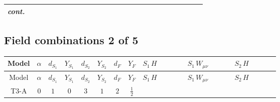\documentclass[8pt]{article}
\begin{document}
\begin{landscape}
\begin{longtable}{@{}cccccccc >{\raggedright\arraybackslash}p{0.21\linewidth} >{\raggedright\arraybackslash}p{0.21\linewidth} >{\raggedright\arraybackslash}p{0.21\linewidth}@{}}
\textit{cont.} &  &  &  &  &  &  &  & \scriptsize\adjustbox{max width=\linewidth}{$\begin{gathered} -H_{a_1} \mu ^2 H_{a_1}{}^{\dagger } \\ +\frac{2 \hbar  \overline{\lambda_{T3}} H_{a_1} H_{a_2} \lambda_{T3} H_{a_1}{}^{\dagger } H_{a_2}{}^{\dagger }}{\epsilon }\end{gathered}$} &  &  \\
\midrule
\bottomrule
\end{longtable}
\clearpage
\subsection*{Field combinations 2 of 5}
\begin{longtable}{@{}cccccccc >{\raggedright\arraybackslash}p{0.21\linewidth} >{\raggedright\arraybackslash}p{0.21\linewidth} >{\raggedright\arraybackslash}p{0.21\linewidth}@{}}
\toprule
Model & $\alpha$ & $d_{S_1}$ & $Y_{S_1}$ & $d_{S_2}$ & $Y_{S_2}$ & $d_F$ & $Y_F$ & $S_1\,H$ & $S_1\,W_{\mu\nu}$ & $S_2\,H$ \\
\midrule
\endfirsthead
\toprule
Model & $\alpha$ & $d_{S_1}$ & $Y_{S_1}$ & $d_{S_2}$ & $Y_{S_2}$ & $d_F$ & $Y_F$ & $S_1\,H$ & $S_1\,W_{\mu\nu}$ & $S_2\,H$ \\
\midrule
\endhead
T3-A & $0$ & $1$ & $0$ & $3$ & $1$ & $2$ & $\frac{1}{2}$ & \scriptsize\adjustbox{max width=\linewidth}{$\begin{gathered} +\frac{1}{2} \hbar  \log \left(\frac{\bar{\mu}^{2}}{M_{S_1}^2}\right) H_{a_3} H_{a_4} H_{a_1}{}^{\dagger } H_{a_2}{}^{\dagger } \mathcal{I}_{H1,a_1,a_3}{}^1 \mathcal{I}_{H1,a_2,a_4}{}^1 \left(\lambda_{H1}^{(1)}\right){}^2\end{gathered}$} &  & \scriptsize\adjustbox{max width=\linewidth}{$\begin{gathered} +\frac{3}{2} \hbar  \log \left(\frac{\bar{\mu}^{2}}{M_{S_2}^2}\right) H_{a_1} H_{a_2} H_{a_1}{}^{\dagger } H_{a_2}{}^{\dagger } \left(\lambda_{H2}^{(2)}\right){}^2\end{gathered}$} \\
\midrule

\end{longtable}
\end{landscape}
\end{document}
